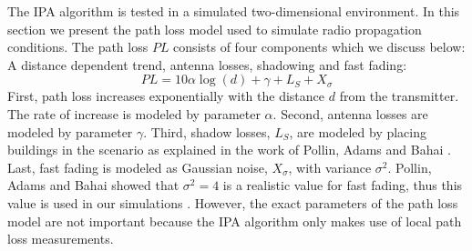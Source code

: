 The IPA algorithm is tested in a simulated two-dimensional environment. In this section we present the path loss model used to simulate radio propagation conditions. The path loss $PL$ consists of four components which we discuss below: A distance dependent trend, antenna losses, shadowing and fast fading:
\begin{equation} \label{eq:plModel}
PL=10\alpha\log(d)+\gamma+L_S+X_{\sigma} \nonumber
\end{equation}
First, path loss increases exponentially with the distance $d$ from the transmitter. The rate of increase is modeled by parameter $\alpha$. Second, antenna losses are modeled by parameter $\gamma$. Third, shadow losses, $L_S$, are modeled by placing buildings in the scenario as explained in the work of Pollin, Adams and Bahai \cite{sofie}. Last, fast fading is modeled as Gaussian noise, $X_{\sigma}$, with variance $\sigma^2$. Pollin, Adams and Bahai showed that $\sigma^2=4$ is a realistic value for fast fading, thus this value is used in our simulations \cite{sofie}. However, the exact parameters of the path loss model are not important because the IPA algorithm only makes use of local path loss measurements.













